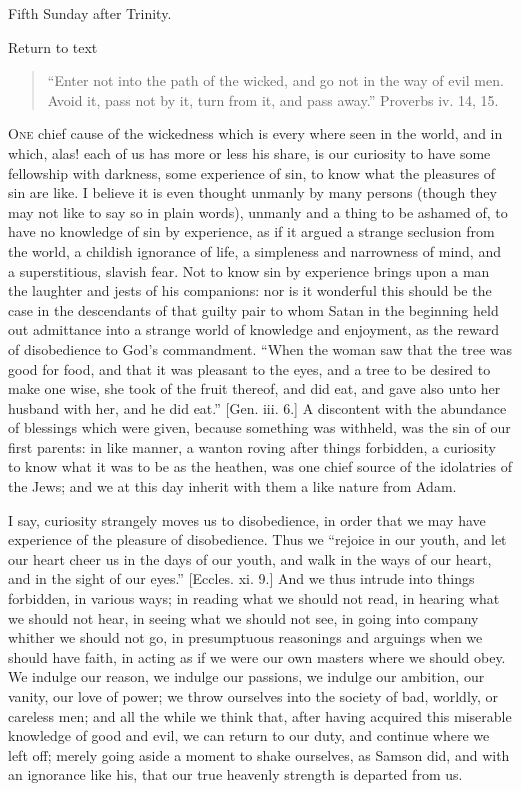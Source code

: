 
Fifth Sunday after Trinity.

Return to text


\begin{quote}

``Enter not into the path of the wicked, and go not in the
way of evil men. Avoid it, pass not by it, turn from it, and pass
away.'' Proverbs iv. 14, 15.

\end{quote}

O\textsc{ne} chief cause of the wickedness which is every where seen in the
world, and in which, alas! each of us has more or less his share, is
our curiosity to have some fellowship with darkness, some experience
of sin, to know what the pleasures of sin are like. I believe it is
even thought unmanly by many persons (though they may not like to say
so in plain words), unmanly and a thing to be ashamed of, to have no
knowledge of sin by experience, as if it argued a strange seclusion
from the world, a childish ignorance of life, a simpleness and
narrowness of mind, and a superstitious, slavish fear. Not to know sin
by experience brings upon a man the laughter and jests of his
companions: nor is it wonderful this should be the case in the
descendants of that guilty pair to whom Satan in the beginning held
out admittance into a strange world of knowledge and enjoyment, as the
reward of disobedience to God's commandment. ``When the woman saw
that the tree was good for food, and that it was pleasant to the eyes,
and a tree to be desired to make one wise, she took of the fruit
thereof, and did eat, and gave also unto her husband with her, and he
did eat.'' [Gen. iii. 6.] A discontent with the abundance of
blessings which were given, because something was withheld, was the
sin of our first parents: in like manner, a wanton roving after things
forbidden, a curiosity to know what it was to be as the heathen, was
one chief source of the idolatries of the Jews; and we at this day
inherit with them a like nature from Adam.

I say, curiosity strangely moves us to disobedience, in order that
we may have experience of the pleasure of disobedience. Thus we
``rejoice in our youth, and let our heart cheer us in the days of
our youth, and walk in the ways of our heart, and in the sight of our
eyes.'' [Eccles. xi. 9.] And we thus intrude into things
forbidden, in various ways; in reading what we should not read, in
hearing what we should not hear, in seeing what we should not see, in
going into company whither we should not go, in presumptuous
reasonings and arguings when we should have faith, in acting as if we
were our own masters where we should obey. We indulge our reason, we
indulge our passions, we indulge our ambition, our vanity, our love of
power; we throw ourselves into the society of bad, worldly, or
careless men; and all the while we think that, after having acquired
this miserable knowledge of good and evil, we can return to our duty,
and continue where we left off; merely going aside a moment to shake
ourselves, as Samson did, and with an ignorance like his, that our
true heavenly strength is departed from us.

